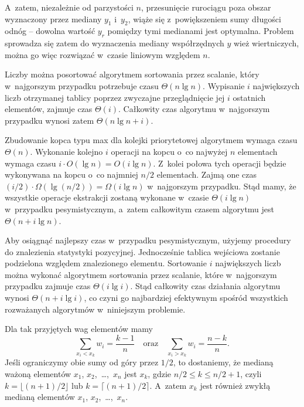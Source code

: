 A~zatem, niezależnie od parzystości $n$, przesunięcie rurociągu poza obszar wyznaczony przez mediany $y_1$ i~$y_2$, wiąże się z~powiększeniem sumy długości odnóg -- dowolna wartość $y_r$ pomiędzy tymi medianami jest optymalna. Problem sprowadza się zatem do wyznaczenia mediany współrzędnych $y$ wież wiertniczych, można go więc rozwiązać w~czasie liniowym względem $n$.

\problems


\subproblem %
Liczby można posortować algorytmem sortowania przez scalanie, który w~najgorszym przypadku potrzebuje czasu $\Theta(n\lg n)$. Wypisanie $i$ największych liczb otrzymanej tablicy poprzez zwyczajne przeglądnięcie jej $i$ ostatnich elementów, zajmuje czas $\Theta(i)$. Całkowity czas algorytmu w~najgorszym przypadku wynosi zatem $\Theta(n\lg n+i)$.

\subproblem %
Zbudowanie kopca typu max dla kolejki priorytetowej algorytmem  wymaga czasu $\Theta(n)$. Wykonanie kolejno $i$ operacji  na kopcu o~co najwyżej $n$ elementach wymaga czasu $i\cdot O(\lg n)=O(i\lg n)$. Z~kolei połowa tych operacji będzie wykonywana na kopcu o~co najmniej $n/2$ elementach. Zajmą one czas $(i/2)\cdot\Omega(\lg(n/2))=\Omega(i\lg n)$ w~najgorszym przypadku. Stąd mamy, że wszystkie operacje ekstrakcji zostaną wykonane w~czasie $\Theta(i\lg n)$ w~przypadku pesymistycznym, a~zatem całkowitym czasem algorytmu jest $\Theta(n+i\lg n)$.

\subproblem %
Aby osiągnąć najlepszy czas w~przypadku pesymistycznym, użyjemy procedury  do znalezienia  statystyki pozycyjnej. Jednocześnie tablica wejściowa zostanie podzielona względem znalezionego elementu. Sortowanie $i$ największych liczb można wykonać algorytmem sortowania przez scalanie, które w~najgorszym przypadku zajmuje czas $\Theta(i\lg i)$. Stąd całkowity czas działania algorytmu wynosi $\Theta(n+i\lg i)$, co czyni go najbardziej efektywnym spośród wszystkich rozważanych algorytmów w~niniejszym problemie.


\subproblem %
Dla tak przyjętych wag elementów mamy
\[
	\sum_{x_i<x_k}w_i = \frac{k-1}{n} \quad\text{oraz}\quad \sum_{x_i>x_k}w_i = \frac{n-k}{n}.
\]
Jeśli ograniczymy obie sumy od góry przez $1/2$, to dostaniemy, że medianą ważoną elementów $x_1$, $x_2$,~\dots,~$x_n$ jest $x_k$, gdzie $n/2\le k\le n/2+1$, czyli $k=\lfloor(n+1)/2\rfloor$ lub $k=\lceil(n+1)/2\rceil$. A~zatem $x_k$ jest również zwykłą medianą elementów $x_1$, $x_2$,~\dots,~$x_n$.

